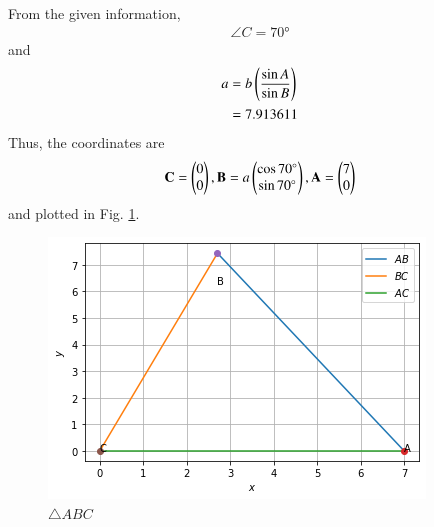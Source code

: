 From the given information, 
%
\begin{align}
\angle{C} = \ang{70}
\end{align}
and 
\begin{align}
  a&= b\left(\frac{\sin{A}}{\sin{B}}\right) 
\\
  &= 7.913611
  \end{align}
%  
Thus, the coordinates are 
\begin{align}
  \mathbf{C} =\begin{pmatrix}0 \\ 0\end{pmatrix},
  \mathbf{B} =a\begin{pmatrix}\cos{\ang{70}} \\ \sin{\ang{70}}\end{pmatrix},
  \mathbf{A} =\begin{pmatrix}7 \\ 0\end{pmatrix}
  \end{align}
and plotted in Fig. \ref{july/2/4/fig:triangle}.	  
%
\begin{figure}[!h]
\centering
\includegraphics[width=\columnwidth]{solutions/july/2/4/Figure 1.jpeg}
\caption{$\triangle ABC$}
\label{july/2/4/fig:triangle}	
\end{figure}


